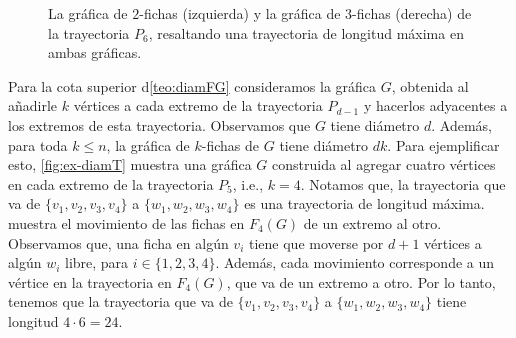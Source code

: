 \begin{figure}[ht!]

\caption{La gr\'afica de $2$-fichas (izquierda) y la gr\'afica de $3$-fichas
(derecha) de la trayectoria $P_6$, resaltando una trayectoria de longitud
m\'axima en ambas gr\'aficas.}
\label{fig:ex-diamP}       
\end{figure}

Para la cota superior d\cref{teo:diamFG} consideramos la gr\'afica $G$, obtenida
al a\~{n}adirle $k$ v\'ertices a cada extremo de la trayectoria $P_{d -1}$ y
hacerlos adyacentes a los extremos de esta trayectoria. Observamos que $G$ tiene
di\'ametro $d$. Adem\'as, para toda $k \leq n$, la gr\'afica de $k$-fichas de
$G$ tiene di\'ametro $dk$. Para ejemplificar esto, \cref{fig:ex-diamT} muestra
una gr\'afica $G$ construida al agregar cuatro v\'ertices en cada extremo de la
trayectoria $P_5$, i.e., $k=4$. Notamos que, la trayectoria que va de
$\{v_1,v_2,v_3,v_4\}$ a $\{w_1,w_2,w_3,w_4\}$ es una trayectoria de longitud
m\'axima.  muestra el movimiento de las fichas en $F_4(G)$ de
un extremo al otro. Observamos que, una ficha en alg\'un $v_i$ tiene que moverse
por $d +1$ v\'ertices a alg\'un $w_i$ libre, para $i \in \{1,2,3,4\}$. Adem\'as,
cada movimiento corresponde a un v\'ertice en la trayectoria en $F_4(G)$, que va
de un extremo a otro. Por lo tanto, tenemos que la trayectoria que va de
$\{v_1,v_2,v_3,v_4\}$ a $\{w_1,w_2,w_3,w_4\}$ tiene longitud $4 \cdot 6 = 24$.

